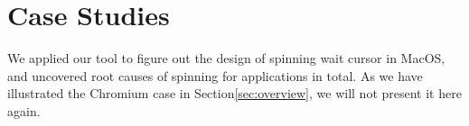 \section{Case Studies} \label{sec:casestudy}

We applied our tool to figure out the design of spinning wait cursor in MacOS,
and uncovered root causes of spinning for \nbug applications in total. As we
have illustrated the Chromium case in Section\ref{sec:overview}, we will not
present it here again.












